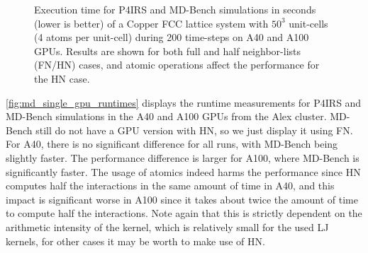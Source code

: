 \documentclass[preprint,12pt]{elsarticle}
\begin{document}
\begin{figure}[t]
\vspace{-3ex}
	\caption{Execution time for P4IRS and MD-Bench simulations in seconds (lower is better) of a Copper FCC lattice system with $50^{3}$ unit-cells (4 atoms per unit-cell) during 200 time-steps on A40 and A100 GPUs. Results are shown for both full and half neighbor-lists (FN/HN) cases, and atomic operations affect the performance for the HN case.}
\vspace{-2ex}
\centering
\label{fig:md_single_gpu_runtimes}
\end{figure}

\autoref{fig:md_single_gpu_runtimes} displays the runtime measurements for P4IRS and MD-Bench simulations in the A40 and A100 GPUs from the Alex cluster.
MD-Bench still do not have a GPU version with \ac{HN}, so we just display it using \ac{FN}.
For A40, there is no significant difference for all runs, with MD-Bench being slightly faster.
The performance difference is larger for A100, where MD-Bench is significantly faster.
The usage of atomics indeed harms the performance since \ac{HN} computes half the interactions in the same amount of time in A40, and this impact is significant worse in A100 since it takes about twice the amount of time to compute half the interactions.
Note again that this is strictly dependent on the arithmetic intensity of the kernel, which is relatively small for the used \ac{LJ} kernels, for other cases it may be worth to make use of \ac{HN}.
\end{document}
